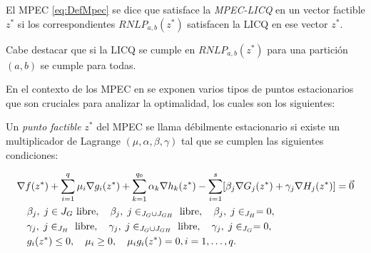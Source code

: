 \begin{definition}
El MPEC \eqref{eq:DefMpec} se dice que satisface la \textit{MPEC-LICQ}  en un vector factible $z^*$ si los correspondientes $RNLP_{a,b}(z^*)$ satisfacen la LICQ  en ese vector $z^*$.
\end{definition}
    Cabe destacar que si la LICQ se cumple en  $RNLP_{a,b}(z^*)$ para una partici\'on $(a,b)$ se cumple para todas. 

En el contexto de los MPEC en \cite{Flegel2003AFJ} se exponen varios tipos de puntos estacionarios que son cruciales para analizar la optimalidad, los cuales son los siguientes:
\begin{definition}
    Un \textit{punto factible} $z^*$ del MPEC se llama débilmente estacionario si existe un multiplicador de Lagrange $ (\mu, \alpha, \beta, \gamma)$ tal que se cumplen las siguientes condiciones:
    
\begin{align}
& \nabla f(z^*) + \sum_{i=1}^q \mu_i\nabla g_i(z^*) + \sum_{k=1}^{q_0} \alpha_k\nabla h_k(z^*) - \sum_{i=1}^{s} [\beta_j\nabla G_j(z^*) + \gamma_j\nabla H_j(z^*)] = \vec{0} \notag\\
    & \quad \begin{aligned}
        & \beta_j,\; j\in {J_G} \text{ libre}, \quad  \beta_j,\; j\in _{J_G\cup J_{GH}} \text{ libre}, \quad \beta_j,\; j\in _{J_H}= 0, \\
        &  \gamma_j,\; j\in _{J_H} \text{ libre}, \quad  \gamma_j,\; j\in _{J_G\cup J_{GH}} \text{ libre}, \quad \gamma_j,\; j\in _{J_G}= 0,  \\
        & g_i(z^*) \leq 0, \quad \mu_i \geq 0, \quad \mu_i g_i(z^*) = 0, i=1,\ldots, q.
    \end{aligned} \\
& \label{eq:Definici\'on_punto_debilemente_estacionario} \notag
\end{align}
\end{definition}

